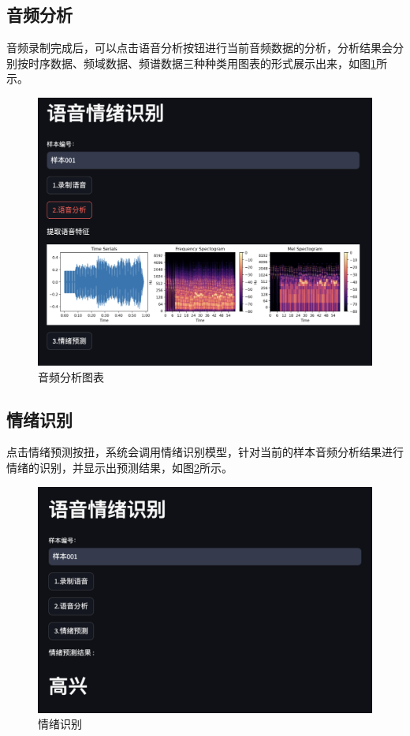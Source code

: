 \documentclass[lang=cn,newtx,12pt,scheme=chinese]{elegantbook}
\begin{document}
\subsection{音频分析}

音频录制完成后，可以点击语音分析按钮进行当前音频数据的分析，分析结果会分别按时序数据、频域数据、频谱数据三种种类用图表的形式展示出来，如图\ref{fig4}所示。

\begin{figure}
	\label{fig4}
	\includegraphics[width=\textwidth]{image/截图4.png}
	\caption{音频分析图表}
\end{figure}

\subsection{情绪识别}

点击情绪预测按扭，系统会调用情绪识别模型，针对当前的样本音频分析结果进行情绪的识别，并显示出预测结果，如图\ref{fig5}所示。

\begin{figure}
	\label{fig5}
	\includegraphics[width=\textwidth]{image/截图5.png}
	\caption{情绪识别}
\end{figure}
\end{document}
